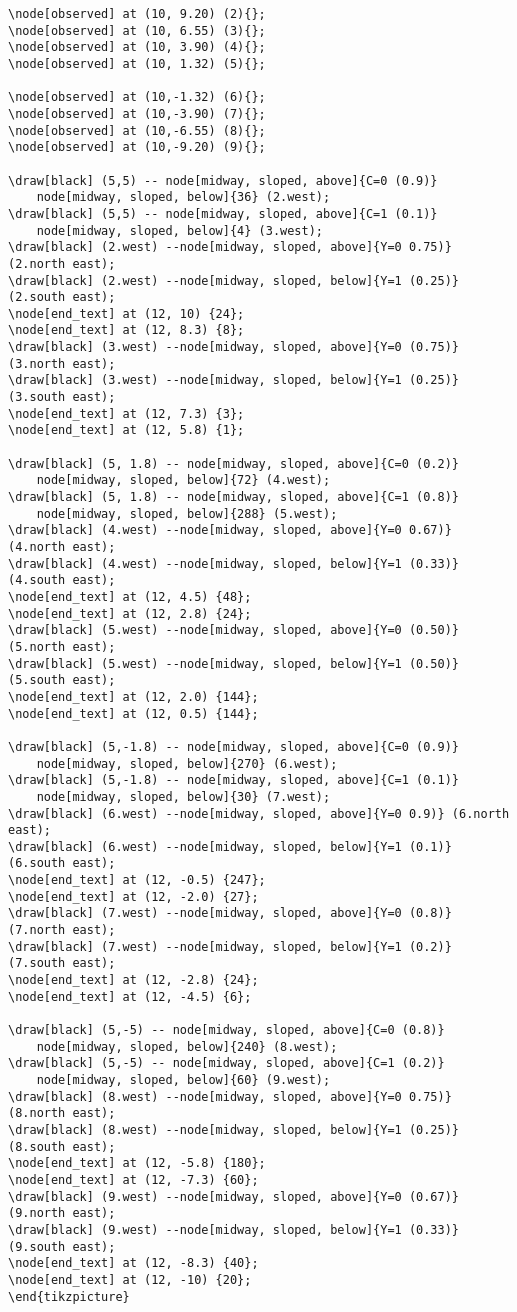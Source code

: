 \documentclass[a4paper]{report}
\begin{document}
\begin{framed}
\begin{Verbatim}
\node[observed] at (10, 9.20) (2){};
\node[observed] at (10, 6.55) (3){};
\node[observed] at (10, 3.90) (4){};
\node[observed] at (10, 1.32) (5){};

\node[observed] at (10,-1.32) (6){};
\node[observed] at (10,-3.90) (7){};
\node[observed] at (10,-6.55) (8){};
\node[observed] at (10,-9.20) (9){};

\draw[black] (5,5) -- node[midway, sloped, above]{C=0 (0.9)} 
	node[midway, sloped, below]{36} (2.west);
\draw[black] (5,5) -- node[midway, sloped, above]{C=1 (0.1)} 
	node[midway, sloped, below]{4} (3.west);
\draw[black] (2.west) --node[midway, sloped, above]{Y=0 0.75)} (2.north east);
\draw[black] (2.west) --node[midway, sloped, below]{Y=1 (0.25)} (2.south east);
\node[end_text] at (12, 10) {24};
\node[end_text] at (12, 8.3) {8};
\draw[black] (3.west) --node[midway, sloped, above]{Y=0 (0.75)} (3.north east);
\draw[black] (3.west) --node[midway, sloped, below]{Y=1 (0.25)} (3.south east);
\node[end_text] at (12, 7.3) {3};
\node[end_text] at (12, 5.8) {1};

\draw[black] (5, 1.8) -- node[midway, sloped, above]{C=0 (0.2)} 
	node[midway, sloped, below]{72} (4.west);
\draw[black] (5, 1.8) -- node[midway, sloped, above]{C=1 (0.8)} 
	node[midway, sloped, below]{288} (5.west);
\draw[black] (4.west) --node[midway, sloped, above]{Y=0 0.67)} (4.north east);
\draw[black] (4.west) --node[midway, sloped, below]{Y=1 (0.33)} (4.south east);
\node[end_text] at (12, 4.5) {48};
\node[end_text] at (12, 2.8) {24};
\draw[black] (5.west) --node[midway, sloped, above]{Y=0 (0.50)} (5.north east);
\draw[black] (5.west) --node[midway, sloped, below]{Y=1 (0.50)} (5.south east);
\node[end_text] at (12, 2.0) {144};
\node[end_text] at (12, 0.5) {144};

\draw[black] (5,-1.8) -- node[midway, sloped, above]{C=0 (0.9)} 
	node[midway, sloped, below]{270} (6.west);
\draw[black] (5,-1.8) -- node[midway, sloped, above]{C=1 (0.1)} 
	node[midway, sloped, below]{30} (7.west);
\draw[black] (6.west) --node[midway, sloped, above]{Y=0 0.9)} (6.north east);
\draw[black] (6.west) --node[midway, sloped, below]{Y=1 (0.1)} (6.south east);
\node[end_text] at (12, -0.5) {247};
\node[end_text] at (12, -2.0) {27};
\draw[black] (7.west) --node[midway, sloped, above]{Y=0 (0.8)} (7.north east);
\draw[black] (7.west) --node[midway, sloped, below]{Y=1 (0.2)} (7.south east);
\node[end_text] at (12, -2.8) {24};
\node[end_text] at (12, -4.5) {6};

\draw[black] (5,-5) -- node[midway, sloped, above]{C=0 (0.8)} 
	node[midway, sloped, below]{240} (8.west);
\draw[black] (5,-5) -- node[midway, sloped, above]{C=1 (0.2)} 
	node[midway, sloped, below]{60} (9.west);
\draw[black] (8.west) --node[midway, sloped, above]{Y=0 0.75)} (8.north east);
\draw[black] (8.west) --node[midway, sloped, below]{Y=1 (0.25)} (8.south east);
\node[end_text] at (12, -5.8) {180};
\node[end_text] at (12, -7.3) {60};
\draw[black] (9.west) --node[midway, sloped, above]{Y=0 (0.67)} (9.north east);
\draw[black] (9.west) --node[midway, sloped, below]{Y=1 (0.33)} (9.south east);
\node[end_text] at (12, -8.3) {40};
\node[end_text] at (12, -10) {20};
\end{tikzpicture}


\end{Verbatim}
\end{framed}
\end{document}

